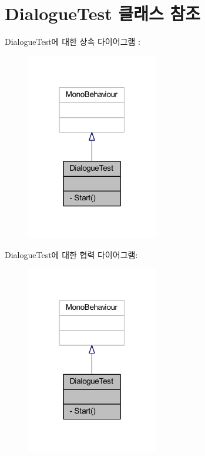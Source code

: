 \hypertarget{class_dialogue_test}{}\section{Dialogue\+Test 클래스 참조}
\label{class_dialogue_test}


Dialogue\+Test에 대한 상속 다이어그램 \+: \nopagebreak
\begin{figure}[H]
\begin{center}
\leavevmode
\includegraphics[width=163pt]{d5/dca/class_dialogue_test__inherit__graph}
\end{center}
\end{figure}


Dialogue\+Test에 대한 협력 다이어그램\+:\nopagebreak
\begin{figure}[H]
\begin{center}
\leavevmode
\includegraphics[width=163pt]{d6/dc5/class_dialogue_test__coll__graph}
\end{center}
\end{figure}
